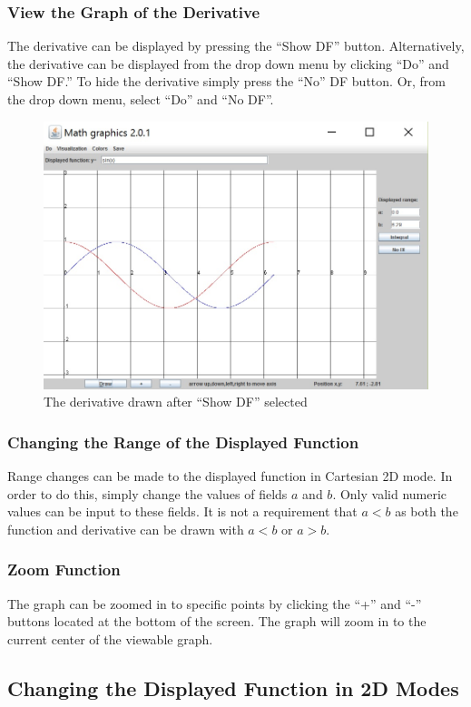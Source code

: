 \documentclass{article}[12 pt]
\begin{document}
 			\subsubsection{View the Graph of the Derivative}
 			The derivative can be displayed by pressing the ``Show DF'' button. Alternatively, the derivative can be displayed from the drop down menu by clicking ``Do'' and ``Show DF.'' To hide the derivative simply press the ``No'' DF button. Or, from the drop down menu, select ``Do'' and ``No DF''.
 				\begin{figure}[h!]
 					\centering
 					\includegraphics[scale = .75]{showDF}
					\caption{The derivative drawn after ``Show DF'' selected}
 				\end{figure}
				
			\subsubsection{Changing the Range of the Displayed Function}
 			Range changes can be made to the displayed function in Cartesian 2D mode. In order to do this, simply change the values of fields $a$ and $b$. Only valid numeric values can be input to these fields. It is not a requirement that $a < b$ as both the function and derivative can be drawn with $a < b$ or $a > b$.
 				
 			\subsubsection{Zoom Function}
			The graph can be zoomed in to specific points by clicking the ``+'' and ``-'' buttons located at the bottom of the screen. The graph will zoom in to the current center of the viewable graph. 

 		
 		\subsection{Changing the Displayed Function in 2D Modes}
 		\lipsum[1]
 				
\end{document}
